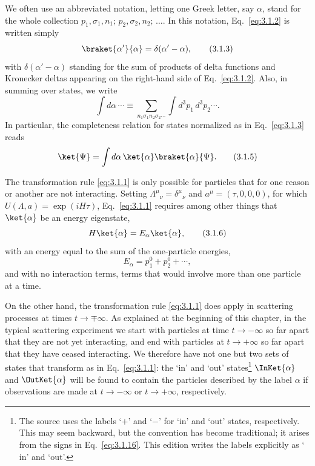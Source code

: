 We often use an abbreviated notation, letting one Greek letter, say $\alpha$,
stand for the whole collection
$p_1,\sigma_1,n_1;\,p_2,\sigma_2,n_2;\,\ldots$. In this notation,
Eq.~\eqref{eq:3.1.2} is written simply
\begin{equation}
\braket{\alpha'}{\alpha}=\delta(\alpha'-\alpha),
\tag{3.1.3}\label{eq:3.1.3}
\end{equation}
with $\delta(\alpha'-\alpha)$ standing for the sum of products of delta
functions and Kronecker deltas appearing on the right-hand side of
Eq.~\eqref{eq:3.1.2}. Also, in summing over states, we write
\begin{equation}
\int d\alpha\,\cdots\equiv
\sum_{n_1\sigma_1n_2\sigma_2\cdots}
\int d^3p_1\,d^3p_2\cdots.
\tag{3.1.4}\label{eq:3.1.4}
\end{equation}
In particular, the completeness relation for states normalized as in
Eq.~\eqref{eq:3.1.3} reads
\begin{equation}
\ket{\Psi}=\int d\alpha\,\ket{\alpha}\braket{\alpha}{\Psi}.
\tag{3.1.5}\label{eq:3.1.5}
\end{equation}

The transformation rule \eqref{eq:3.1.1} is only possible for particles that for one
reason or another are not interacting. Setting
$\Lambda^\mu{}_{\nu}=\delta^\mu{}_{\nu}$ and $a^\mu=(\tau,0,0,0)$, for
which $U(\Lambda,a)=\exp(iH\tau)$, Eq.~\eqref{eq:3.1.1} requires among other things
that $\ket{\alpha}$ be an energy eigenstate,
\begin{equation}
H\ket{\alpha}=E_\alpha\ket{\alpha},
\tag{3.1.6}\label{eq:3.1.6}
\end{equation}
with an energy equal to the sum of the one-particle energies,
\begin{equation}
E_\alpha=p_1^0+p_2^0+\cdots,
\tag{3.1.7}\label{eq:3.1.7}
\end{equation}
and with no interaction terms, terms that would involve more than one
particle at a time.

On the other hand, the transformation rule \eqref{eq:3.1.1} does apply in scattering
processes at times $t\to\mp\infty$. As explained at the beginning of this
chapter, in the typical scattering experiment we start with particles at time
$t\to-\infty$ so far apart that they are not yet interacting, and end with
particles at $t\to+\infty$ so far apart that they have ceased interacting. We
therefore have not one but two sets of states that transform as in
Eq.~\eqref{eq:3.1.1}: the `in' and `out' states\footnote{The source uses the
labels `$+$' and `$-$' for `in' and `out' states, respectively. This may seem
backward, but the convention has become traditional; it arises from the signs
in Eq.~\eqref{eq:3.1.16}. This edition writes the labels explicitly as
`$\mathrm{in}$' and `$\mathrm{out}$'.}
$\InKet{\alpha}$ and $\OutKet{\alpha}$
will be found to contain the particles described by the label $\alpha$ if
observations are made at $t\to-\infty$ or $t\to+\infty$,
respectively.

